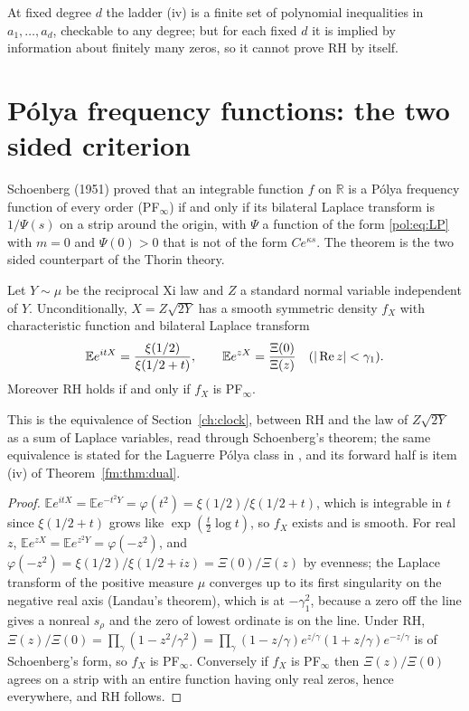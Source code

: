 \begin{remark}
At fixed degree $d$ the ladder (iv) is a finite set of polynomial inequalities in $a_1,\dots,a_d$, checkable to any degree; but for each fixed $d$ it is implied by information about finitely many zeros, so it cannot prove RH by itself.
\end{remark}

\section{P\'olya frequency functions: the two sided criterion}\label{pol:sec:pf}

Schoenberg (1951) \cite{Schoenberg51} proved that an integrable function $f$ on $\mathbb R$ is a P\'olya frequency function of every order (PF$_\infty$) if and only if its bilateral Laplace transform is $1/\Psi(s)$ on a strip around the origin, with $\Psi$ a function of the form \eqref{pol:eq:LP} with $m=0$ and $\Psi(0)>0$ that is not of the form $Ce^{\kappa s}$. The theorem is the two sided counterpart of the Thorin theory.

\begin{proposition}\label{pol:prop:pf}
Let $Y\sim\mu$ be the reciprocal Xi law and $Z$ a standard normal variable independent of $Y$. Unconditionally, $X=Z\sqrt{2Y}$ has a smooth symmetric density $f_X$ with characteristic function and bilateral Laplace transform
\begin{equation}\label{pol:eq:X}
\mathbb Ee^{itX}=\frac{\xi(1/2)}{\xi(1/2+t)},\qquad \mathbb Ee^{zX}=\frac{\Xi(0)}{\Xi(z)}\quad(|\operatorname{Re} z|<\gamma_1).
\end{equation}
Moreover RH holds if and only if $f_X$ is PF$_\infty$.
\end{proposition}

This is the equivalence of Section~\ref{ch:clock}, between RH and the law of $Z\sqrt{2Y}$ as a sum of Laplace variables, read through Schoenberg's theorem; the same equivalence is stated for the Laguerre P\'olya class in \cite[Theorem 2.3 and Corollary 2.4]{KPS24}, and its forward half is item (iv) of Theorem~\ref{fm:thm:dual}.

\begin{proof}
$\mathbb Ee^{itX}=\mathbb Ee^{-t^2Y}=\varphi(t^2)=\xi(1/2)/\xi(1/2+t)$, which is integrable in $t$ since $\xi(1/2+t)$ grows like $\exp(\frac t2\log t)$, so $f_X$ exists and is smooth. For real $z$, $\mathbb Ee^{zX}=\mathbb Ee^{z^2Y}=\varphi(-z^2)$, and $\varphi(-z^2)=\xi(1/2)/\xi(1/2+iz)=\Xi(0)/\Xi(z)$ by evenness; the Laplace transform of the positive measure $\mu$ converges up to its first singularity on the negative real axis (Landau's theorem), which is at $-\gamma_1^2$, because a zero off the line gives a nonreal $s_\rho$ and the zero of lowest ordinate is on the line. Under RH, $\Xi(z)/\Xi(0)=\prod_\gamma(1-z^2/\gamma^2)=\prod_\gamma(1-z/\gamma)e^{z/\gamma}(1+z/\gamma)e^{-z/\gamma}$ is of Schoenberg's form, so $f_X$ is PF$_\infty$. Conversely if $f_X$ is PF$_\infty$ then $\Xi(z)/\Xi(0)$ agrees on a strip with an entire function having only real zeros, hence everywhere, and RH follows.
\end{proof}

